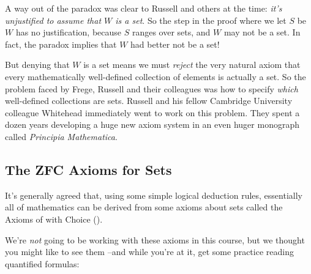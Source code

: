 
A way out of the paradox was clear to Russell and others at the time:
\emph{it's unjustified to assume that $W$ is a set}.  So the step in the
proof where we let $S$ be $W$ has no justification, because $S$ ranges
over sets, and $W$ may not be a set.  In fact, the paradox implies that
$W$ had better not be a set!

But denying that $W$ is a set means we must \emph{reject} the very natural
axiom that every mathematically well-defined collection of elements is
actually a set.  So the problem faced by Frege, Russell and their
colleagues was how to specify \emph{which} well-defined collections are
sets.  Russell and his fellow Cambridge University colleague Whitehead
immediately went to work on this problem.  They spent a dozen years
developing a huge new axiom system in an even huger monograph called
\emph{Principia Mathematica}.


\subsection{The ZFC Axioms for Sets}
It's generally agreed that, using some simple logical deduction rules,
essentially all of mathematics can be derived from some axioms about sets
called the Axioms of  with Choice ().

We're \emph{not} going to be working with these axioms in this course,
but we thought you might like to see them --and while you're at it, get
some practice reading quantified formulas:
%

